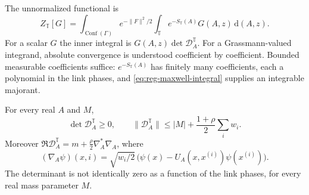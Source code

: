 \documentclass[11pt,letterpaper,reqno]{amsart}
\newcommand{\dd}{\mathrm d}
\begin{document}
The unnormalized functional is
\begin{equation}\label{eq:reg-functional}
 Z_{\mathbb T}[G]=\int_{\operatorname{Conf}(\Gamma)}
      e^{-\|F\|^2/2}\int_{\mathbb T}e^{-S_{\mathbb T}(A)}G(A,z)
      \,\dd(A,z).
\end{equation}
For a scalar $G$ the inner integral is
$G(A,z)\det \mathcal D_A^{\mathbb T}$. For a Grassmann-valued integrand,
absolute convergence is understood coefficient by coefficient.
Bounded measurable coefficients suffice: $e^{-S_{\mathbb T}(A)}$
has finitely many coefficients, each a polynomial in the link phases,
and \eqref{eq:reg-maxwell-integral} supplies an integrable majorant.

\begin{proposition}\label{prop:reg-determinant-sign}
For every real $A$ and $M$,
\[
 \det \mathcal D_A^{\mathbb T}\ge0,
 \qquad
 \|\mathcal D_A^{\mathbb T}\|\le |M|+\frac{1+\rho}{2}\sum_iw_i.
\]
Moreover $\Re \mathcal D_A^{\mathbb T}=m+\frac\rho2\nabla_A^*\nabla_A$, where
\[
 (\nabla_A\psi)(x,i)=\sqrt{w_i/2}\,
           \bigl(\psi(x)-U_A(x,x^{(i)})\psi(x^{(i)})\bigr).
\]
The determinant is not identically zero as a function of the link
phases, for every real mass parameter $M$.
\end{proposition}
\end{document}
